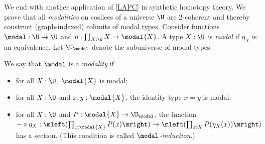 We end with another application of \autoref{LAPC} in synthetic homotopy theory. We prove that all \emph{modalities} on coslices of a universe $\U$ are $2$-coherent and thereby construct (graph-indexed) colimits of modal types. Consider functions $\modal : \U \to \U$ and $\eta : \prod_{X : \U}X \to \modal{X}$. A type $X : \U$ is \emph{modal} if $\eta_X$ is an equivalence. Let $\U_{\modal}$ denote the subuniverse of modal types.
\begin{defi}
We say that $\modal$ is a \emph{modality} if 
\begin{itemize}
\item for all $X : \U$, $\modal{X}$ is modal;
\item for all $X : \U$ and $x, y : \modal{X}$, the identity type $x = y$ is modal;
\item for all $X : \U$ and $P : \modal{X} \to \U_{\modal}$, the function ${-} \circ \eta_X : \mleft(\prod_{x : \modal{X}}P(x)\mright) \to \mleft(\prod_{x : X}P(\eta_X(x))\mright)$ has a section. (This condition is called \emph{$\modal$-induction}.)
\end{itemize}
\end{defi} 
 

